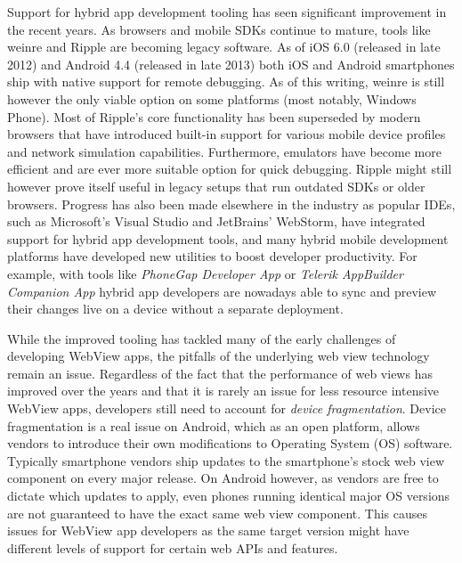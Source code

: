 \documentclass[thesis.tex]{subfiles}
\begin{document}
Support for hybrid app development tooling has seen significant improvement in the recent years. As browsers and mobile SDKs continue to mature, tools like weinre and Ripple are becoming legacy software. As of iOS 6.0 (released in late 2012) and Android 4.4 (released in late 2013) both iOS and Android smartphones ship with native support for remote debugging. As of this writing, weinre is still however the only viable option on some platforms (most notably, Windows Phone). Most of Ripple's core functionality has been superseded by modern browsers that have introduced built-in support for various mobile device profiles and network simulation capabilities. Furthermore, emulators have become more efficient and are ever more suitable option for quick debugging. Ripple might still however prove itself useful in legacy setups that run outdated SDKs or older browsers. Progress has also been made elsewhere in the industry as popular IDEs, such as Microsoft's Visual Studio and JetBrains' WebStorm, have integrated support for hybrid app development tools, and many hybrid mobile development platforms have developed new utilities to boost developer productivity. For example, with tools like \textit{PhoneGap Developer App} or \textit{Telerik AppBuilder Companion App} hybrid app developers are nowadays able to sync and preview their changes live on a device without a separate deployment.

While the improved tooling has tackled many of the early challenges of developing WebView apps, the pitfalls of the underlying web view technology remain an issue. Regardless of the fact that the performance of web views has improved over the years and that it is rarely an issue for less resource intensive WebView apps, developers still need to account for \textit{device fragmentation}. Device fragmentation is a real issue on Android, which as an open platform, allows vendors to introduce their own modifications to Operating System (OS) software. Typically smartphone vendors ship updates to the smartphone's stock web view component on every major release. On Android however, as vendors are free to dictate which updates to apply, even phones running identical major OS versions are not guaranteed to have the exact same web view component. This causes issues for WebView app developers as the same target version might have different levels of support for certain web APIs and features.
\end{document}
